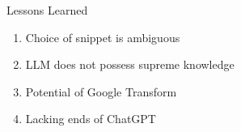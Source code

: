 \documentclass{beamer}
\begin{document}
\begin{frame}{Lessons Learned}
    \begin{enumerate}

        \item Choice of snippet is ambiguous
    
        \vspace{0.5cm}
        \item LLM does not possess supreme knowledge
            
        \vspace{0.5cm}
        \item Potential of Google Transform
            
        \vspace{0.5cm}    
        \item Lacking ends of ChatGPT
        
    \end{enumerate}
\end{frame}
\end{document}
